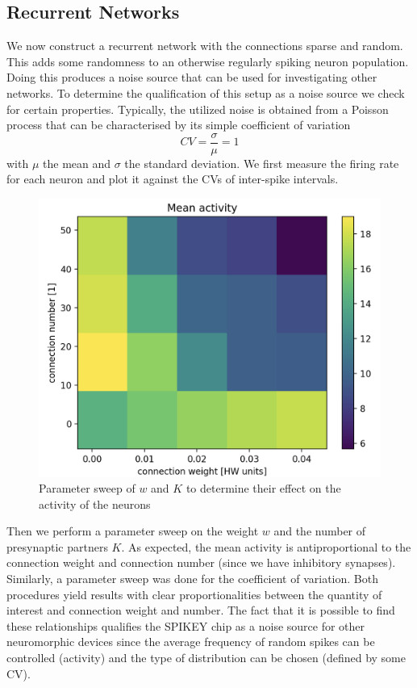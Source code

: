 \documentclass[a4paper,twocolumn]{article}
\begin{document}
\subsection{Recurrent Networks}
We now construct a recurrent network with the connections sparse and random.
This adds some randomness to an otherwise regularly spiking neuron population.
Doing this produces a noise source that can be used for investigating other networks.
To determine the qualification of this setup as a noise source we check for certain
properties.  Typically,  the utilized noise is obtained from a Poisson process
that can be characterised by its simple coefficient of variation
\begin{equation}
	CV = \frac{\sigma}{\mu} = 1
\end{equation}
with $\mu$ the mean and $\sigma$ the standard deviation. We first measure the
firing rate for each neuron and plot it against the CVs of inter-spike intervals.
\begin{figure}[ht]
    \centering
    \includegraphics[width=.5\textwidth]{figures/activity_sweep.png}
    \caption{Parameter sweep of $w$ and $K$ to determine their effect on the activity of the neurons}
    \label{fig:activity_sweep}
\end{figure}
Then we perform a parameter sweep on the weight $w$ and the number of presynaptic
partners $K$.  As expected, the mean activity is antiproportional to the connection weight
and connection number (since we have inhibitory synapses).  Similarly,  a parameter sweep
was done for the coefficient of variation.  Both procedures yield results with clear proportionalities
between the quantity of interest and connection weight and number.  The fact that it is possible
to find these relationships qualifies the SPIKEY chip as a noise source for other neuromorphic
devices since the average frequency of random spikes can be controlled (activity) and the type
of distribution can be chosen (defined by some CV).
\end{document}
